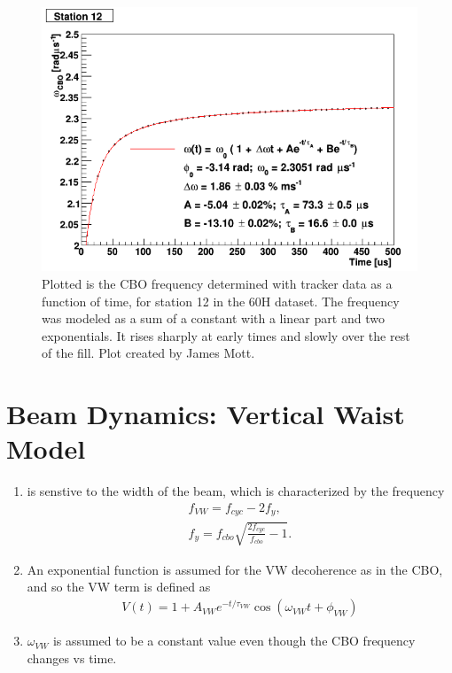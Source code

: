 	\begin{figure}[]
		\centering
		\includegraphics[width=\textwidth]{TrackerCBOModel}
	    \caption[TrackerCBOModel]{Plotted is the CBO frequency determined with tracker data as a function of time, for station 12 in the 60H dataset. The frequency was modeled as a sum of a constant with a linear part and two exponentials. It rises sharply at early times and slowly over the rest of the fill. Plot created by James Mott.}
	    \label{fig:TrackerCBOModel}
	\end{figure}


\section{Beam Dynamics: Vertical Waist Model}
\label{Sec:VW}

	\begin{enumerate}
		\item{\wa is senstive to the width of the beam, which is characterized by the frequency 
			\begin{gather}
				f_{VW} = f_{cyc} - 2f_{y}, \\
				f_{y} = f_{cbo} \sqrt{\frac{2f_{cyc}}{f_{cbo}} - 1}.
			\end{gather}}
		\item{An exponential function is assumed for the VW decoherence as in the CBO, and so the VW term is defined as
			\begin{gather}
					V(t) = 1 + A_{VW} e^{-t/\tau_{VW}} \cos(\omega_{VW}t + \phi_{VW})
			\end{gather}
		}
		\item{$\omega_{VW}$ is assumed to be a constant value even though the CBO frequency changes vs time.}
	\end{enumerate}

